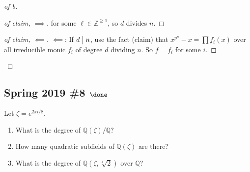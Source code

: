 \begin{solution}
\begin{proof}[of b]
\begin{proof}[of claim, $\implies$]
for some \(\ell \in {\mathbb{Z}}^{\geq 1}\), so \(d\) divides \(n\).

\end{proof}

\begin{proof}[of claim, $\impliedby$]

\(\impliedby\): If \(d\bigm|n\), use the fact (claim) that
\(x^{p^n} - x = \prod f_i(x)\) over all irreducible monic \(f_i\) of
degree \(d\) dividing \(n\). So \(f = f_i\) for some \(i\).

\end{proof}

\end{proof}

\end{solution}

\hypertarget{spring-2019-8-done}{%
\subsection{\texorpdfstring{Spring 2019 \#8
\(\done\)}{Spring 2019 \#8 \textbackslash done}}\label{spring-2019-8-done}}

Let \(\zeta = e^{2\pi i/8}\).

\begin{enumerate}
\def\labelenumi{\alph{enumi}.}
\item
  What is the degree of \({\mathbb{Q}}(\zeta)/{\mathbb{Q}}\)?
\item
  How many quadratic subfields of \({\mathbb{Q}}(\zeta)\) are there?
\item
  What is the degree of \({\mathbb{Q}}(\zeta, \sqrt[4] 2)\) over
  \({\mathbb{Q}}\)?
\end{enumerate}

